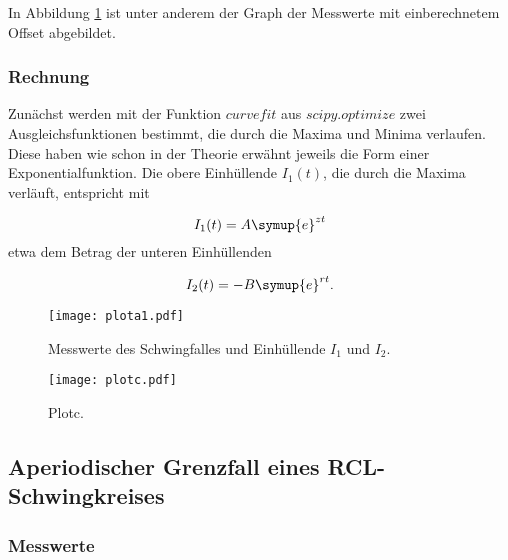 In Abbildung \ref{fig:Schwingfall} ist unter anderem der Graph der Messwerte
mit einberechnetem Offset abgebildet.

\subsubsection{Rechnung}

Zunächst werden mit der Funktion $curvefit$ aus $scipy.optimize$ zwei
Ausgleichsfunktionen bestimmt, die durch die Maxima und Minima
verlaufen. Diese haben wie schon in der Theorie erwähnt jeweils die Form einer
Exponentialfunktion.
Die obere Einhüllende $I_1(t)$, die durch die Maxima verläuft, entspricht mit

\begin{equation}
  I_1(t) = A \symup{e}^{zt}
\end{equation}
etwa dem Betrag der unteren Einhüllenden

\begin{equation}
  I_2(t) = - B \symup{e}^{rt}.
\end{equation}


\begin{figure}[h]
  \centering
  \texttt{[image: plota1.pdf]}
  \caption{Messwerte des Schwingfalles und Einhüllende $I_1$ und $I_2$.}
  \label{fig:Schwingfall}
\end{figure}

\begin{figure}[h]
  \centering
  \texttt{[image: plotc.pdf]}
  \caption{Plotc.}
  \label{fig:plotc}
\end{figure}

\subsection{Aperiodischer Grenzfall eines RCL-Schwingkreises}

\subsubsection{Messwerte}
